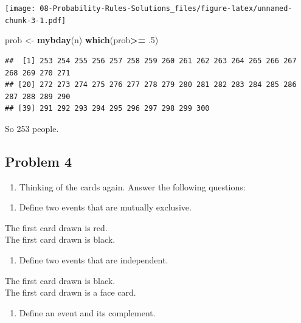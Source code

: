 \documentclass[
]{book}
\newenvironment{Shaded}{\begin{snugshade}}{\end{snugshade}}
\newcommand{\FloatTok}[1]{\textcolor[rgb]{0.00,0.00,0.81}{#1}}
\newcommand{\KeywordTok}[1]{\textcolor[rgb]{0.13,0.29,0.53}{\textbf{#1}}}
\newcommand{\NormalTok}[1]{#1}
\newcommand{\OperatorTok}[1]{\textcolor[rgb]{0.81,0.36,0.00}{\textbf{#1}}}
\newcommand{\StringTok}[1]{\textcolor[rgb]{0.31,0.60,0.02}{#1}}
\providecommand{\tightlist}{%
  \setlength{\itemsep}{0pt}\setlength{\parskip}{0pt}}
\begin{document}
\texttt{[image: 08-Probability-Rules-Solutions\_files/figure-latex/unnamed-chunk-3-1.pdf]}

\begin{Shaded}
\begin{Highlighting}[]
\NormalTok{prob <-}\StringTok{ }\KeywordTok{mybday}\NormalTok{(n)}
\KeywordTok{which}\NormalTok{(prob}\OperatorTok{>=}\StringTok{ }\FloatTok{.5}\NormalTok{)}
\end{Highlighting}
\end{Shaded}

\begin{verbatim}
##  [1] 253 254 255 256 257 258 259 260 261 262 263 264 265 266 267 268 269 270 271
## [20] 272 273 274 275 276 277 278 279 280 281 282 283 284 285 286 287 288 289 290
## [39] 291 292 293 294 295 296 297 298 299 300
\end{verbatim}

So 253 people.

\hypertarget{problem-4-1}{%
\subsection{Problem 4}\label{problem-4-1}}

\begin{enumerate}
\def\labelenumi{\arabic{enumi}.}
\setcounter{enumi}{3}
\tightlist
\item
  Thinking of the cards again. Answer the following questions:
\end{enumerate}

\begin{enumerate}
\def\labelenumi{\alph{enumi}.}
\tightlist
\item
  Define two events that are mutually exclusive.
\end{enumerate}

The first card drawn is red.\\
The first card drawn is black.

\begin{enumerate}
\def\labelenumi{\alph{enumi}.}
\setcounter{enumi}{1}
\tightlist
\item
  Define two events that are independent.
\end{enumerate}

The first card drawn is black.\\
The first card drawn is a face card.

\begin{enumerate}
\def\labelenumi{\alph{enumi}.}
\setcounter{enumi}{2}
\tightlist
\item
  Define an event and its complement.
\end{enumerate}
\end{document}

